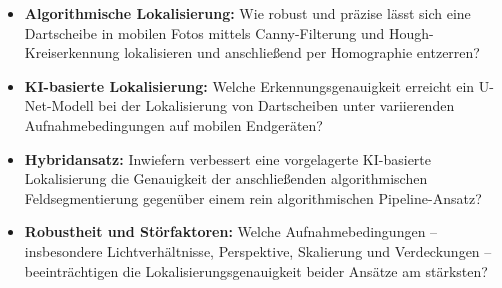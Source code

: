 \begin{itemize}
    \item \textbf{Algorithmische Lokalisierung:}
          Wie robust und präzise lässt sich eine Dartscheibe in mobilen Fotos
          mittels Canny-Filterung und Hough-Kreiserkennung lokalisieren und
          anschließend per Homographie entzerren?

    \item \textbf{KI-basierte Lokalisierung:}
          Welche Erkennungsgenauigkeit erreicht ein U-Net-Modell bei der
          Lokalisierung von Dartscheiben unter variierenden Aufnahmebedingungen
          auf mobilen Endgeräten?

    \item \textbf{Hybridansatz:}
          Inwiefern verbessert eine vorgelagerte KI-basierte Lokalisierung
          die Genauigkeit der anschließenden algorithmischen Feldsegmentierung
          gegenüber einem rein algorithmischen Pipeline-Ansatz?

    \item \textbf{Robustheit und Störfaktoren:}
          Welche Aufnahmebedingungen -- insbesondere Lichtverhältnisse,
          Perspektive, Skalierung und Verdeckungen -- beeinträchtigen die
          Lokalisierungsgenauigkeit beider Ansätze am stärksten?
\end{itemize}